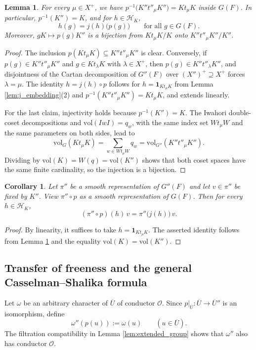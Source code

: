\documentclass[12pt]{article}
\numberwithin{equation}{section}
\newtheorem{lemma}[theorem]{Lemma}
\newtheorem{corollary}[theorem]{Corollary}
\theoremstyle{definition}
\theoremstyle{remark}
\theoremstyle{plain}
\begin{document}
\begin{lemma}\label{lem:cartan_preimage}
For every $\mu \in X^+$, we have $p^{-1}\big(K'' t''_\mu K''\big) = K t_\mu K$ inside $G(F)$. In particular, $p^{-1}(K'') = K$, and for $h \in \mathcal{H}_K$,
$$h(g) = j(h)\big(p(g)\big) \qquad \text{for all } g \in G(F).$$
Moreover, $g K \mapsto p(g)K''$ is a bijection from $K t_\mu K / K$ onto $K'' t''_\mu K'' / K''$.
\end{lemma}
\begin{proof}
The inclusion $p(Kt_\mu K) \subseteq K''t''_\mu K''$ is clear. Conversely, if $p(g) \in K''t''_\mu K''$ and $g \in Kt_\lambda K$ with $\lambda \in X^+$, then $p(g) \in K''t''_\lambda K''$, and disjointness of the Cartan decomposition of $G''(F)$ over $(X'')^+ \supseteq X^+$ forces $\lambda = \mu$. The identity $h = j(h)\circ p$ follows for $h = \mathbf{1}_{Kt_\mu K}$ from Lemma \ref{lem:j_embedding}(2) and $p^{-1}(K''t''_\mu K'') = Kt_\mu K$, and extends linearly.

For the last claim, injectivity holds because $p^{-1}(K'') = K$. The Iwahori double-coset decompositions and $\mathrm{vol}(IwI) = q_w$, with the same index set $Wt_\mu W$ and the same parameters on both sides, lead to
$$\mathrm{vol}_G(Kt_\mu K) = \sum_{w \in Wt_\mu W} q_w = \mathrm{vol}_{G''}(K''t''_\mu K'').$$
Dividing by $\mathrm{vol}(K) = W(q) = \mathrm{vol}(K'')$ shows that both coset spaces have the same finite cardinality, so the injection is a bijection.
\end{proof}

\begin{corollary}\label{cor:hecke_action_compatibility}
Let $\pi''$ be a smooth representation of $G''(F)$ and let $v \in \pi''$ be fixed by $K''$. View $\pi'' \circ p$ as a smooth representation of $G(F)$. Then for every $h \in \mathcal{H}_K$,
$$(\pi''\circ p)(h)\, v = \pi''\big(j(h)\big)\, v.$$
\end{corollary}
\begin{proof}
By linearity, it suffices to take $h=\mathbf{1}_{Kt_\mu K}$. The asserted identity follows from Lemma \ref{lem:cartan_preimage} and the equality $\mathrm{vol}(K)=\mathrm{vol}(K'')$.
\end{proof}

\subsection{Transfer of freeness and the general Casselman--Shalika formula}

Let $\omega$ be an arbitrary character of $\overline U$ of conductor $\mathcal O$. Since $p|_{\overline U}:\overline U\to\overline U''$ is an isomorphism, define
$$\omega''(p(u)):=\omega(u)\qquad(u\in\overline U).$$
The filtration compatibility in Lemma \ref{lem:extended_group} shows that $\omega''$ also has conductor $\mathcal O$.
\end{document}
